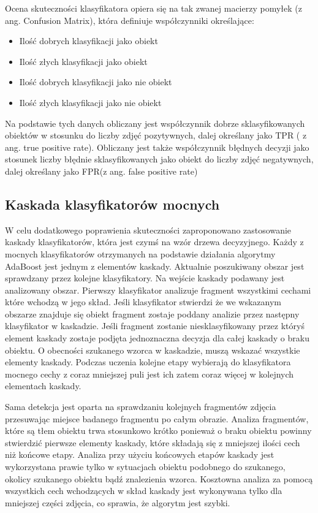 \documentclass{article}
\numberwithin{equation}{section}
\begin{document}
Ocena skuteczności klasyfikatora opiera się na tak zwanej macierzy pomyłek (z ang. Confusion Matrix), która definiuje współczynniki określające:
\begin{itemize}
    \item Ilość dobrych klasyfikacji jako obiekt
    \item Ilość złych klasyfikacji jako obiekt
    \item Ilość dobrych klasyfikacji jako nie obiekt
    \item Ilość złych klasyfikacji jako nie obiekt
\end{itemize}

Na podstawie tych danych obliczany jest współczynnik dobrze sklasyfikowanych obiektów w stosunku do liczby zdjęć pozytywnych, dalej określany jako TPR ( z ang. true positive rate). Obliczany jest także współczynnik błędnych decyzji jako stosunek liczby błędnie sklasyfikowanych jako obiekt do liczby zdjęć negatywnych, dalej określany jako FPR(z ang. false positive rate)

\subsection{Kaskada klasyfikatorów mocnych}
W celu dodatkowego poprawienia skuteczności zaproponowano zastosowanie kaskady klasyfikatorów, która jest czymś na wzór drzewa decyzyjnego. Każdy z mocnych klasyfikatorów otrzymanych na podstawie działania algorytmy AdaBoost jest jednym z elementów kaskady. Aktualnie poszukiwany obszar jest sprawdzany przez kolejne klasyfikatory. Na wejście kaskady podawany jest analizowany obszar. Pierwszy klasyfikator analizuje fragment wszystkimi cechami które wchodzą w jego skład. Jeśli klasyfikator stwierdzi że we wskazanym obszarze znajduje się obiekt fragment zostaje poddany analizie przez następny klasyfikator w kaskadzie. Jeśli fragment zostanie niesklasyfikowany przez któryś element kaskady zostaje podjęta jednoznaczna decyzja dla całej kaskady o braku obiektu. O obecności szukanego wzorca w kaskadzie, muszą wskazać wszystkie elementy kaskady. Podczas uczenia kolejne etapy wybierają do klasyfikatora mocnego cechy z coraz mniejszej puli jest ich zatem coraz więcej w kolejnych elementach kaskady. 
	
Sama detekcja jest oparta na sprawdzaniu kolejnych fragmentów zdjęcia przesuwając miejsce badanego fragmentu po całym obrazie. Analiza fragmentów, które są tłem obiektu trwa stosunkowo krótko ponieważ o braku obiektu powinny stwierdzić pierwsze elementy kaskady, które składają się z mniejszej ilości cech niż końcowe etapy. Analiza przy użyciu końcowych etapów kaskady jest wykorzystana prawie tylko w sytuacjach obiektu podobnego do szukanego, okolicy szukanego obiektu bądź znalezienia wzorca.
Kosztowna analiza za pomocą wszystkich cech wchodzących w skład kaskady jest wykonywana tylko dla mniejszej części zdjęcia, co sprawia, że algorytm jest szybki.
\end{document}
